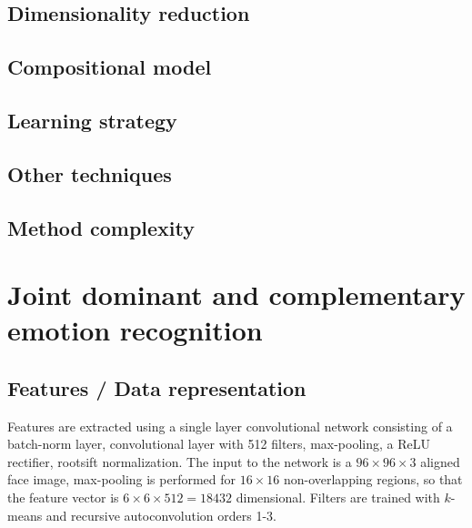\documentclass{article}
\begin{document}
\subsection{Dimensionality reduction}

\subsection{Compositional model}

\subsection{Learning strategy}

\subsection{Other techniques}

\subsection{Method complexity}


\section{Joint dominant and complementary emotion recognition}
\subsection{Features / Data representation}
Features are extracted using a single layer convolutional network consisting of a batch-norm layer, convolutional layer with 512 filters, max-pooling, a ReLU rectifier, rootsift normalization. The input to the network is a $96\times96\times3$ aligned face image, max-pooling is performed for $16\times16$ non-overlapping regions, so that the feature vector is $6\times6\times512=18432$ dimensional.
Filters are trained with $k$-means and recursive autoconvolution orders 1-3.
\end{document}

